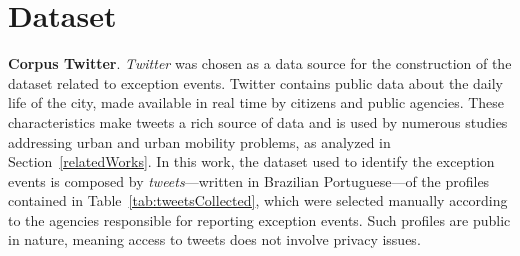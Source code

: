 \documentclass[runningheads]{llncs}
\begin{document}

\section{Dataset}
\label{dataSet}
\textbf{Corpus Twitter}. \textit{Twitter} was chosen as a data source for the construction of the dataset related to exception events. Twitter contains public data about the daily life of the city, made available in real time by citizens and public agencies. These characteristics make tweets a rich source of data and is used by numerous studies addressing urban and urban mobility problems, as analyzed in Section~\ref{relatedWorks}. In this work, the dataset used to identify the exception events is composed by \textit{tweets}---written in Brazilian Portuguese---of the profiles contained in Table~\ref{tab:tweetsCollected}, which were selected manually according to the agencies responsible for reporting exception events. Such profiles are public in nature, meaning access to tweets does not involve privacy issues.
\end{document}
